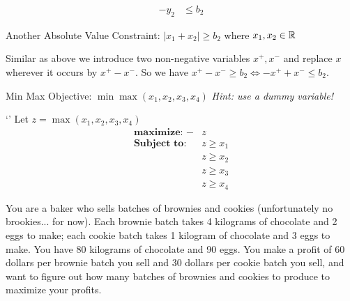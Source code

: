 \documentclass[11pt]{article}
\begin{document}
\begin{subparts}
\begin{solution}
\begin{align*}
        -y_2 &\le b_2
    \end{align*}
  \end{solution}
  \subpart Another Absolute Value Constraint: $|x_1 + x_2| \geq b_2$ where $x_1, x_2 \in \mathbb{R}$\\
  \begin{solution}
    Similar as above we introduce two non-negative variables $x^+, x^-$ and replace $x$ wherever it occurs 
    by $x^+-x^-$. So we have $x^+-x^- \geq b_2 \Leftrightarrow -x^{+} + x^{-} \le b_2$.
  \end{solution}
  \subpart Min Max Objective: $\min \max (x_1,x_2,x_3,x_4)$
  \emph{Hint: use a dummy variable!}\\
  \begin{solution}`'
    Let $z = \max (x_1,x_2,x_3,x_4)$
    \begin{align*}
        \textbf{maximize: } -&z\\
        \textbf{Subject to: } &z \geq x_1\\
        &z \geq x_2\\
        &z \geq x_3\\
        &z \geq x_4
    \end{align*}
  \end{solution}

\end{subparts}

\newpage


You are a baker who sells batches of brownies and cookies (unfortunately no brookies... for now). Each brownie batch takes 4 kilograms of chocolate and 2 eggs to make; each cookie batch takes 1 kilogram of chocolate and 3 eggs to make. You have 80 kilograms of chocolate and 90 eggs. You make a profit of 60 dollars per brownie batch you sell and 30 dollars per cookie batch you sell, and want to figure out how many batches of brownies and cookies to produce to maximize your profits.
\end{document}
